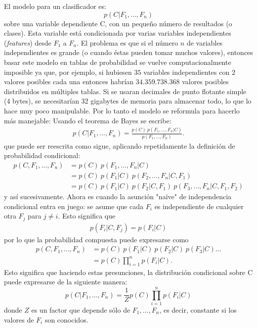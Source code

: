 	El modelo para un clasificador es:
		$$p(C \vert F_1,\dots,F_n)$$
	sobre una variable dependiente C, con un pequeño número de resultados (o clases). Esta variable está condicionada por varias variables independientes (\textit{features}) desde $F_1$ a $F_n$. El problema es que si el número $n$ de variables independientes es grande (o cuando éstas pueden tomar muchos valores), entonces basar este modelo en tablas de probabilidad se vuelve computacionalmente imposible ya que, por ejemplo, si hubiesen $35$ variables independientes con $2$ valores posibles cada una entonces habrían $34.359.738.368$ valores posibles distribuidos en múltiples tablas. Si se usaran decimales de punto flotante simple (4 bytes), se necesitarían 32 gigabytes de memoria para almacenar todo, lo que lo hace muy poco manipulable. Por lo tanto el modelo se reformula para hacerlo más manejable:
Usando el teorema de Bayes se escribe:
		\begin{align*}
		p(C \vert F_1,\dots,F_n) = \frac{p(C) \ p(F_1,\dots,F_n\vert C)}{p(F_1,\dots,F_n)}.
		\end{align*}
		que puede ser reescrita como sigue, aplicando repetidamente la definición de probabilidad condicional:
		\begin{align}
		p(C, F_1, \dots, F_n)
		&= p(C) \ p(F_1,\dots,F_n\vert C) \\
		&= p(C) \ p(F_1\vert C) \ p(F_2,\dots,F_n\vert C, F_1) \\
		&= p(C) \ p(F_1\vert C) \ p(F_2\vert C, F_1) \ p(F_3,\dots,F_n\vert C, F_1, F_2)
		\end{align}
		y así sucesivamente. Ahora es cuando la asunción "na\"{i}ve" de independencia condicional entra en juego: se asume que cada $F_i$ es independiente de cualquier otra $F_j$ para $j \neq i$. Esto significa que
		\begin{align*}
		p(F_i \vert C, F_j) = p(F_i \vert C)
		\end{align*}
		por lo que la probabilidad compuesta puede expresarse como
		\begin{align*}
		p(C, F_1, \dots, F_n) 
		&= p(C) \ p(F_1\vert C) \ p(F_2\vert C) \ p(F_3\vert C) \dots \\
		&= p(C) \prod_{i=1}^n p(F_i \vert C).
		\end{align*}
		Esto significa que haciendo estas presunciones, la distribución condicional sobre C puede expresarse de la siguiente manera:
		$$p(C \vert F_1,\dots,F_n) = \frac{1}{Z}p(C)\prod_{i=1}^n p(F_i \vert C)$$
		donde $Z$ es un factor que depende sólo de $F_1,\dots , F_n$, es decir, constante si los valores de $F_i$ son conocidos.
		